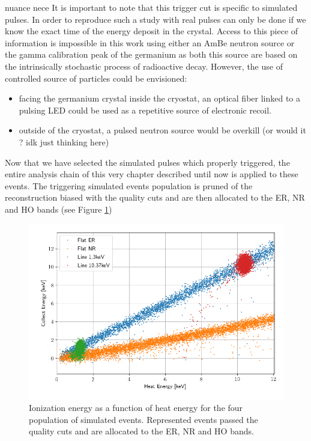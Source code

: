 {\color{red} nuance nece}
It is important to note that this trigger cut is specific to simulated pulses. In order to reproduce such a study with real pulses can only be done if we know the exact time of the energy deposit in the crystal. Access to this piece of information is impossible in this work using either an AmBe neutron source or the gamma calibration peak of the germanium as both this source are based on the intrinsically stochastic process of radioactive decay. However, the use of controlled source of particles could be envisioned:
\begin{itemize}
	\item facing the germanium crystal inside the cryostat, an optical fiber linked to a pulsing LED could be used as a repetitive source of electronic recoil.
	\item outside of the cryostat, a pulsed neutron source would be overkill (or would it ? idk just thinking here)
\end{itemize}

Now that we have selected the simulated pulses which properly triggered, the entire analysis chain of this very chapter \label{ChapterNeutron} described until now is applied to these events. The triggering simulated events population is pruned of the reconstruction biased with the quality cuts and are then allocated to the ER, NR and HO bands (see Figure \ref{fig:band-cut-ecei-simu})

\begin{figure}
\centering
\includegraphics[width=\linewidth,]{Figures/Neutron/band_cut_ecei_simu.png}
\caption{Ionization energy as a function of heat energy for the four population of simulated events. Represented events passed the quality cuts and are allocated to the ER, NR and HO bands.}
\label{fig:band-cut-ecei-simu}
\end{figure}


